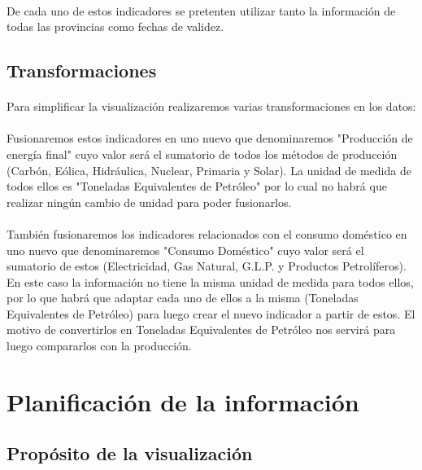 \documentclass{article}
\begin{document}
			\paragraph{}
			De cada uno de estos indicadores se pretenten utilizar tanto la información de todas las provincias como fechas de validez.

		\subsection{Transformaciones}

			\paragraph{}
			Para simplificar la visualización realizaremos varias transformaciones en los datos:

			\paragraph{}
			Fusionaremos estos indicadores en uno nuevo que denominaremos "Producción de energía final" cuyo valor será el sumatorio de todos los métodos de producción (Carbón, Eólica, Hidráulica, Nuclear, Primaria y Solar). La unidad de medida de todos ellos es "Toneladas Equivalentes de Petróleo" por lo cual no habrá que realizar ningún cambio de unidad para poder fusionarlos.

			\paragraph{}
			 También fusionaremos los indicadores relacionados con el consumo doméstico en uno nuevo que  denominaremos  "Consumo Doméstico" cuyo valor será el sumatorio de estos (Electricidad, Gas Natural, G.L.P. y Productos Petrolíferos). En este caso la información no tiene la misma unidad de medida para todos ellos, por lo que habrá que adaptar cada uno de ellos a la misma (Toneladas Equivalentes de Petróleo) para luego crear el nuevo indicador a partir de estos. El motivo de convertirlos en Toneladas Equivalentes de Petróleo nos servirá para luego compararlos con la producción.


	\section{Planificación de la información}

		\subsection{Propósito de la visualización}
\end{document}
